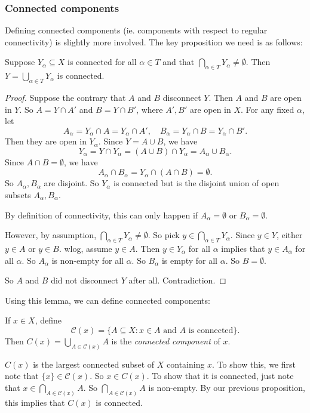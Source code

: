 \documentclass[a4paper]{article}
\begin{document}
\subsubsection{Connected components}
Defining connected components (ie. components with respect to regular connectivity) is slightly more involved. The key proposition we need is as follows:

\begin{prop}
  Suppose $Y_\alpha\subseteq X$ is connected for all $\alpha\in T$ and that $\bigcap_{\alpha\in T}Y_\alpha \not= \emptyset$. Then $Y = \bigcup_{\alpha\in T}Y_\alpha$ is connected.
\end{prop}

\begin{proof}
  Suppose the contrary that $A$ and $B$ disconnect $Y$. Then $A$ and $B$ are open in $Y$. So $A = Y\cap A'$ and $B = Y\cap B'$, where $A', B'$ are open in $X$. For any fixed $\alpha$, let
  \[
    A_\alpha = Y_\alpha \cap A = Y_\alpha \cap A',\quad B_\alpha = Y_\alpha\cap B = Y_\alpha \cap B'.
  \]
  Then they are open in $Y_\alpha$. Since $Y = A\cup B$, we have
  \[
    Y_\alpha = Y\cap Y_\alpha = (A\cup B)\cap Y_\alpha = A_\alpha \cup B_\alpha.
  \]
  Since $A\cap B = \emptyset$, we have
  \[
    A_\alpha \cap B_\alpha =  Y_\alpha \cap (A\cap B) = \emptyset.
  \]
  So $A_\alpha, B_\alpha$ are disjoint. So $Y_\alpha$ is connected but is the disjoint union of open subsets $A_\alpha, B_\alpha$.

  By definition of connectivity, this can only happen if $A_\alpha = \emptyset$ or $B_\alpha = \emptyset$.

  However, by assumption, $\displaystyle\bigcap_{\alpha \in T}Y_\alpha \not= \emptyset$. So pick $\displaystyle y\in \bigcap_{\alpha\in T}Y_\alpha$. Since $y\in Y$, either $y\in A$ or $y\in B$. wlog, assume $y\in A$. Then $y\in Y_\alpha$ for all $\alpha$ implies that $y\in A_\alpha$ for all $\alpha$. So $A_\alpha$ is non-empty for all $\alpha$. So $B_\alpha$ is empty for all $\alpha$. So $B = \emptyset$.

  So $A$ and $B$ did not disconnect $Y$ after all. Contradiction.
\end{proof}

Using this lemma, we can define connected components:

\begin{defi}
  If $x\in X$, define
  \[
    \mathcal{C}(x) = \{A\subseteq X: x\in A\text{ and }A\text{ is connected}\}.
  \]
  Then $\displaystyle C(x) = \bigcup_{A\in \mathcal{C}(x)} A$ is the \emph{connected component} of $x$.
\end{defi}
$C(x)$ is the largest connected subset of $X$ containing $x$. To show this, we first note that $\{x\}\in \mathcal{C}(x)$. So $x\in C(x)$. To show that it is connected, just note that $x\in \bigcap_{A\in \mathcal{C}(x)}A$. So $\bigcap_{A\in \mathcal{C}(x)}A$ is non-empty. By our previous proposition, this implies that $C(x)$ is connected.
\end{document}
